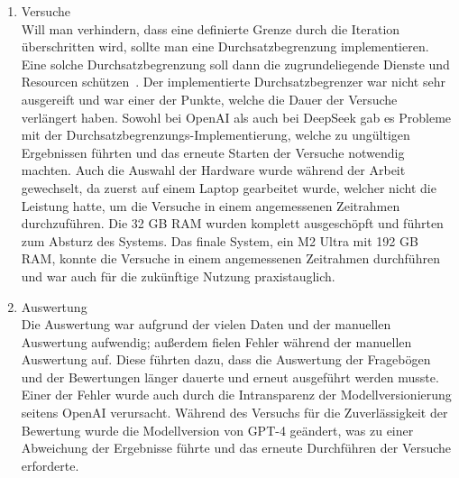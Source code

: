 \begin{enumerate}
    \item{Versuche}\\
    Will man verhindern, dass eine definierte Grenze durch die Iteration überschritten wird, sollte man eine Durchsatzbegrenzung implementieren.
    Eine solche Durchsatzbegrenzung soll dann die zugrundeliegende Dienste und Resourcen schützen~\cite{BuiltinRateLimiter}.
    Der implementierte Durchsatzbegrenzer war nicht sehr ausgereift und war einer der Punkte, welche die Dauer der Versuche verlängert haben.
    Sowohl bei OpenAI als auch bei DeepSeek gab es Probleme mit der Durchsatzbegrenzungs-Implementierung, welche zu ungültigen Ergebnissen führten und das erneute Starten der Versuche notwendig machten.
    Auch die Auswahl der Hardware wurde während der Arbeit gewechselt, da zuerst auf einem Laptop gearbeitet wurde, welcher nicht die Leistung hatte, um die Versuche in einem angemessenen Zeitrahmen durchzuführen.
    Die 32 GB RAM wurden komplett ausgeschöpft und führten zum Absturz des Systems.
    Das finale System, ein M2 Ultra mit 192 GB RAM, konnte die Versuche in einem angemessenen Zeitrahmen durchführen und war auch für die zukünftige Nutzung praxistauglich.

    \item{Auswertung}\\
    Die Auswertung war aufgrund der vielen Daten und der manuellen Auswertung aufwendig; außerdem fielen Fehler während der manuellen Auswertung auf.
    Diese führten dazu, dass die Auswertung der Fragebögen und der Bewertungen länger dauerte und erneut ausgeführt werden musste.
    Einer der Fehler wurde auch durch die Intransparenz der Modellversionierung seitens OpenAI verursacht.
    Während des Versuchs für die Zuverlässigkeit der Bewertung wurde die Modellversion von GPT-4 geändert, was zu einer Abweichung der Ergebnisse führte und das erneute Durchführen der Versuche erforderte.

\end{enumerate}